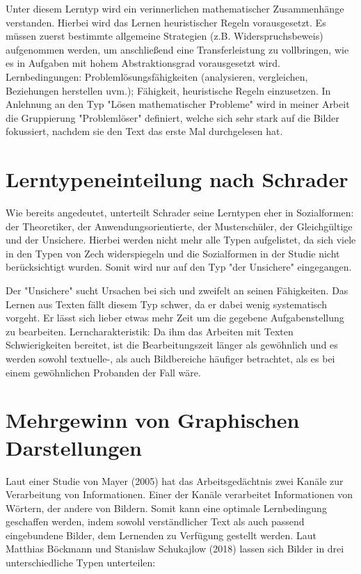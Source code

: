 Unter diesem Lerntyp wird ein verinnerlichen mathematischer Zusammenhänge verstanden. Hierbei wird das Lernen heuristischer Regeln vorausgesetzt. Es müssen zuerst bestimmte allgemeine Strategien (z.B. Widerspruchsbeweis) aufgenommen werden, um anschließend eine Transferleistung zu vollbringen, wie es in Aufgaben mit hohem Abstraktionsgrad vorausgesetzt wird. 
Lernbedingungen: Problemlösungsfähigkeiten (analysieren, vergleichen, Beziehungen herstellen uvm.); Fähigkeit, heuristische Regeln einzusetzen.
In Anlehnung an den Typ "Lösen mathematischer Probleme" wird in meiner Arbeit die Gruppierung "Problemlöser" definiert, welche sich sehr stark auf die Bilder fokussiert, nachdem sie den Text das erste Mal durchgelesen hat.

\section{Lerntypeneinteilung nach Schrader}

Wie bereits angedeutet, unterteilt Schrader seine Lerntypen eher in Sozialformen: der Theoretiker, der Anwendungsorientierte, der Musterschüler, der Gleichgültige und der Unsichere. Hierbei werden nicht mehr alle Typen aufgelistet, da sich viele in den Typen von Zech widerspiegeln und die Sozialformen in der Studie nicht berücksichtigt wurden. Somit wird nur auf den Typ "der Unsichere" eingegangen.

Der "Unsichere" sucht Ursachen bei sich und zweifelt an seinen Fähigkeiten. Das Lernen aus Texten fällt diesem Typ schwer, da er dabei wenig systematisch vorgeht. Er lässt sich lieber etwas mehr Zeit um die gegebene Aufgabenstellung zu bearbeiten.
Lerncharakteristik: Da ihm das Arbeiten mit Texten Schwierigkeiten bereitet, ist die Bearbeitungszeit länger als gewöhnlich und es werden sowohl textuelle-, als auch Bildbereiche häufiger betrachtet, als es bei einem gewöhnlichen Probanden der Fall wäre. 

\section{Mehrgewinn von Graphischen Darstellungen}

Laut einer Studie von Mayer (2005) hat das Arbeitsgedächtnis zwei Kanäle zur Verarbeitung von Informationen. Einer der Kanäle verarbeitet Informationen von Wörtern, der andere von Bildern. Somit kann eine optimale Lernbedingung geschaffen werden, indem sowohl verständlicher Text als auch passend eingebundene Bilder, dem Lernenden zu Verfügung gestellt werden. Laut Matthias Böckmann und Stanislaw Schukajlow (2018) lassen sich Bilder in drei unterschiedliche Typen unterteilen:
    

